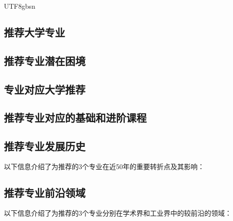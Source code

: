 \documentclass[12pt]{article}
\begin{document}
\begin{CJK*}{UTF8}{gbsn}
   

   \newpage
   \subsection*{推荐大学专业}

   \newpage 
   \subsection*{推荐专业潜在困境}


   \newpage
   \subsection*{专业对应大学推荐}
                  


   \newpage
   \subsection*{推荐专业对应的基础和进阶课程}


   
   \newpage
   \subsection*{推荐专业发展历史}
   以下信息介绍了为推荐的3个专业在近50年的重要转折点及其影响：

   \newpage
   \subsection*{推荐专业前沿领域}
   以下信息介绍了为推荐的3个专业分别在学术界和工业界中的较前沿的领域：
   \newline


\end{CJK*}
\end{document}
